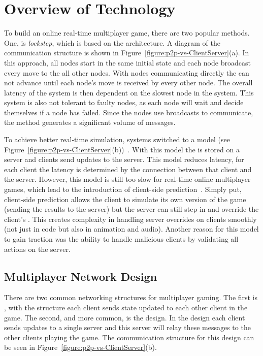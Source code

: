 
\section{Overview of Technology}

To build an online real-time multiplayer game, there are two popular methods.
One, is \ptoP \emph{lockstep}, which is based on the \ptoP architecture.
A diagram of the \ptoP communication structure is shown in Figure~\ref{figure:p2p-vs-ClientServer}(a).
In this approach, all nodes start in the same initial state and each node broadcast every move to the all other nodes.
With nodes communicating directly the \gamestate can not advance until each node's move is received by every other node.
The overall latency of the system is then dependent on the slowest node in the system.
This system is also not tolerant to faulty nodes, as each node will wait and decide themselves if a node has failed.
Since the nodes use broadcasts to communicate, the method generates a significant volume of messages.

To achieve better real-time simulation, systems switched to a \clientServer model (see Figure~\ref{figure:p2p-vs-ClientServer}(b))~\cite{DOOMfaq}. 
With this model the \gamestate is stored on a server and clients send updates to the server.
This model reduces latency, for each client the latency is determined by the connection between that client and the server.
However, this model is still too slow for real-time online multiplayer games, which lead to the introduction of client-side prediction~\cite{bernier2001latency}.
Simply put, client-side prediction allows the client to simulate its own version of the game (sending the results to the server) but the server can still step in and override the client's \gamestate.
This creates complexity in handling server overrides on clients smoothly (not just in code but also in animation and audio).
Another reason for this model to gain traction was the ability to handle malicious clients by validating all actions on the server.



\subsection{Multiplayer Network Design}

	There are two common networking structures for multiplayer gaming. The first is \ptoP, with the structure each client sends state updated to each other client in the game.
	The second, and more common, is the \clientServer design. In the \clientServer design each client sends updates to a single server and this server will relay these messages to the other clients playing the game. The communication structure for this design can be seen in Figure~\ref{figure:p2p-vs-ClientServer}(b).
	
